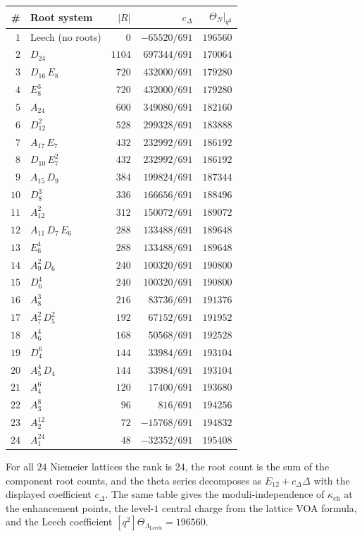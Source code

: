 \begin{center}
\small
\renewcommand{\arraystretch}{1.2}
\begin{tabular}{rlrrr}
\toprule
\# & \textbf{Root system} & $|R|$ & $c_\Delta$ & $\Theta_N|_{q^2}$ \\
\midrule
$1$ & Leech (no roots) & $0$ & $-65520/691$ & $196560$ \\
$2$ & $D_{24}$ & $1104$ & $697344/691$ & $170064$ \\
$3$ & $D_{16}\,E_8$ & $720$ & $432000/691$ & $179280$ \\
$4$ & $E_8^3$ & $720$ & $432000/691$ & $179280$ \\
$5$ & $A_{24}$ & $600$ & $349080/691$ & $182160$ \\
$6$ & $D_{12}^2$ & $528$ & $299328/691$ & $183888$ \\
$7$ & $A_{17}\,E_7$ & $432$ & $232992/691$ & $186192$ \\
$8$ & $D_{10}\,E_7^2$ & $432$ & $232992/691$ & $186192$ \\
$9$ & $A_{15}\,D_9$ & $384$ & $199824/691$ & $187344$ \\
$10$ & $D_8^3$ & $336$ & $166656/691$ & $188496$ \\
$11$ & $A_{12}^2$ & $312$ & $150072/691$ & $189072$ \\
$12$ & $A_{11}\,D_7\,E_6$ & $288$ & $133488/691$ & $189648$ \\
$13$ & $E_6^4$ & $288$ & $133488/691$ & $189648$ \\
$14$ & $A_9^2\,D_6$ & $240$ & $100320/691$ & $190800$ \\
$15$ & $D_6^4$ & $240$ & $100320/691$ & $190800$ \\
$16$ & $A_8^3$ & $216$ & $83736/691$ & $191376$ \\
$17$ & $A_7^2\,D_5^2$ & $192$ & $67152/691$ & $191952$ \\
$18$ & $A_6^4$ & $168$ & $50568/691$ & $192528$ \\
$19$ & $D_4^6$ & $144$ & $33984/691$ & $193104$ \\
$20$ & $A_5^4\,D_4$ & $144$ & $33984/691$ & $193104$ \\
$21$ & $A_4^6$ & $120$ & $17400/691$ & $193680$ \\
$22$ & $A_3^8$ & $96$ & $816/691$ & $194256$ \\
$23$ & $A_2^{12}$ & $72$ & $-15768/691$ & $194832$ \\
$24$ & $A_1^{24}$ & $48$ & $-32352/691$ & $195408$ \\
\bottomrule
\end{tabular}
\end{center}
For all \(24\) Niemeier lattices the rank is \(24\), the root count is
the sum of the component root counts, and the theta series decomposes
as \(E_{12}+c_\Delta\Delta\) with the displayed coefficient
\(c_\Delta\). The same table gives the moduli-independence of
\(\kappa_{\mathrm{ch}}\) at the enhancement points, the level-\(1\)
central charge from the lattice VOA formula, and the Leech coefficient
\([q^2]\Theta_{\Lambda_{\mathrm{Leech}}}=196560\).

